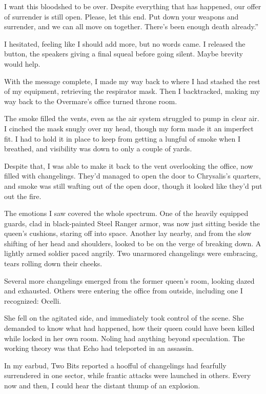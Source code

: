 \leavevmode{}I want this bloodshed to be over. Despite everything that has happened, our offer of surrender is still open. Please, let this end. Put down your weapons and surrender, and we can all move on together. There’s been enough death already.”

I hesitated, feeling like I should add more, but no words came. I released the button, the speakers giving a final squeal before going silent. Maybe brevity would help.

With the message complete, I made my way back to where I had stashed the rest of my equipment, retrieving the respirator mask. Then I backtracked, making my way back to the Overmare’s office turned throne room.

The smoke filled the vents, even as the air system struggled to pump in clear air. I cinched the mask snugly over my head, though my form made it an imperfect fit. I had to hold it in place to keep from getting a lungful of smoke when I breathed, and visibility was down to only a couple of yards.

Despite that, I was able to make it back to the vent overlooking the office, now filled with changelings. They’d managed to open the door to Chrysalis’s quarters, and smoke was still wafting out of the open door, though it looked like they’d put out the fire.

The emotions I saw covered the whole spectrum. One of the heavily equipped guards, clad in black-painted Steel Ranger armor, was now just sitting beside the queen’s cushions, staring off into space. Another lay nearby, and from the slow shifting of her head and shoulders, looked to be on the verge of breaking down. A lightly armed soldier paced angrily. Two unarmored changelings were embracing, tears rolling down their cheeks.

Several more changelings emerged from the former queen’s room, looking dazed and exhausted. Others were entering the office from outside, including one I recognized: Ocelli.

She fell on the agitated side, and immediately took control of the scene. She demanded to know what had happened, how their queen could have been killed while locked in her own room. Noling had anything beyond speculation. The working theory was that Echo had teleported in an assassin.

In my earbud, Two Bits reported a hoofful of changelings had fearfully surrendered in one sector, while frantic attacks were launched in others. Every now and then, I could hear the distant thump of an explosion.


